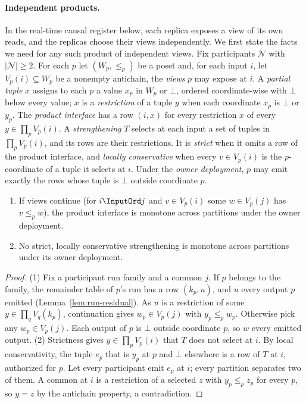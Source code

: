 \paragraph{Independent products.}
In the real-time causal register below, each replica exposes a view of its
own reads, and the replicas choose their views independently.  We first state
the facts we need for any such product of independent views.  Fix participants
$\mathcal N$ with $|\mathcal N|\ge2$.  For each $p$ let $(W_p,\le_p)$ be a poset
and, for each input $i$, let $V_p(i)\subseteq W_p$ be a nonempty antichain, the
\emph{views} $p$ may expose at $i$.  A \emph{partial tuple} $x$ assigns to each
$p$ a value $x_p$ in $W_p$ or $\bot$, ordered coordinate-wise with $\bot$ below
every value; $x$ is a \emph{restriction} of a tuple $y$ when each coordinate
$x_p$ is $\bot$ or $y_p$.  The \emph{product interface} has a row
$(i,x)$ for every restriction $x$ of every $y\in\prod_pV_p(i)$.  A
\emph{strengthening} $T$ selects at each input a set of tuples in
$\prod_pV_p(i)$, and its rows are their restrictions.  It is \emph{strict} when
it omits a row of the product interface, and \emph{locally conservative} when
every $v\in V_p(i)$ is the $p$-coordinate of a tuple it selects at $i$.  Under
the \emph{owner deployment}, $p$ may emit exactly the rows whose tuple is
$\bot$ outside coordinate $p$.

\begin{theorem}
\label{thm:product-frontier}
\leavevmode
\begin{enumerate}
  \item If views continue (for $i\InputOrd j$ and $v\in V_p(i)$ some $w\in
        V_p(j)$ has $v\le_p w$), the product interface is monotone across
        partitions under the owner deployment.
  \item No strict, locally conservative strengthening is monotone across
        partitions under its owner deployment.
\end{enumerate}
\end{theorem}

\begin{proof}
(1) Fix a participant run family and a common \indesc $j$.  If $p$ belongs to
the family, the remainder table of $p$'s run has a row $(k_p,u)$, and $u$ \outrel every output $p$ emitted
(Lemma~\ref{lem:run-residual}).  As $u$ is a restriction of some
$y\in\prod_qV_q(k_p)$, continuation gives $w_p\in V_p(j)$ with $y_p\le_p w_p$.
Otherwise pick any $w_p\in V_p(j)$.  Each output of $p$ is $\bot$ outside
coordinate $p$, so $w$ \outrel every emitted output.
(2) Strictness gives $y\in\prod_pV_p(i)$ that $T$ does not select at $i$.  By
local conservativity, the tuple $e_p$ that is $y_p$ at $p$ and $\bot$
elsewhere is a row of $T$ at $i$, authorized for $p$.  Let every participant
emit $e_p$ at $i$; every partition separates two of them.  A common \outnoun
at $i$ is a restriction of a selected $z$ with $y_p\le_p z_p$ for every $p$, so
$y=z$ by the antichain property, a contradiction.
\end{proof}

